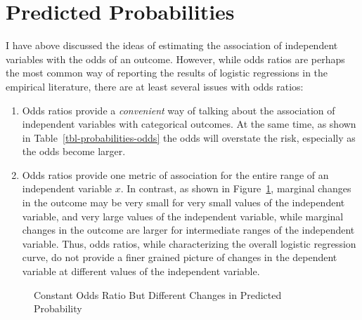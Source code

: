 \documentclass[
  letterpaper,
  DIV=11,
  numbers=noendperiod]{scrreprt}
\providecommand{\tightlist}{%
  \setlength{\itemsep}{0pt}\setlength{\parskip}{0pt}}\usepackage{longtable,booktabs,array}
\begin{document}
\section{Predicted Probabilities}\label{predicted-probabilities}

I have above discussed the ideas of estimating the association of
independent variables with the odds of an outcome. However, while odds
ratios are perhaps the most common way of reporting the results of
logistic regressions in the empirical literature, there are at least
several issues with odds ratios:

\begin{enumerate}
\def\labelenumi{\arabic{enumi}.}
\tightlist
\item
  Odds ratios provide a \emph{convenient} way of talking about the
  association of independent variables with categorical outcomes. At the
  same time, as shown in Table~\ref{tbl-probabilities-odds} the odds
  will overstate the risk, especially as the odds become larger.
\item
  Odds ratios provide one metric of association for the entire range of
  an independent variable \(x\). In contrast, as shown in
  Figure~\ref{fig-marginal-changes-2}, marginal changes in the outcome
  may be very small for very small values of the independent variable,
  and very large values of the independent variable, while marginal
  changes in the outcome are larger for intermediate ranges of the
  independent variable. Thus, odds ratios, while characterizing the
  overall logistic regression curve, do not provide a finer grained
  picture of changes in the dependent variable at different values of
  the independent variable.
\end{enumerate}

\begin{figure}


\caption{\label{fig-marginal-changes-2}Constant Odds Ratio But Different
Changes in Predicted Probability}

\end{figure}%
\end{document}
